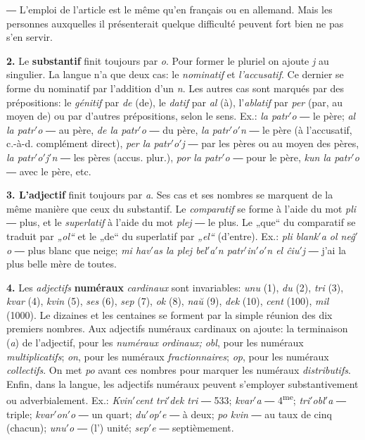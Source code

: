 {\footnotesize {} ― L’emploi de l’article est le même qu’en français ou en allemand. Mais les personnes auxquelles il présenterait quelque difficulté peuvent fort bien ne pas s’en servir.}

\textbf{2.} Le \textbf{substantif} finit toujours par \emph{o}. Pour former le pluriel on ajoute \emph{j} au singulier. La langue n’a que deux cas: le \emph{nominatif} et \emph{l’accusatif}. Ce dernier se forme du nominatif par l’addition d’un \emph{n}. Les autres cas sont marqués par des prépositions: le \emph{génitif} par \emph{de} (de), le \emph{datif} par \emph{al} (à), l’\emph{ablatif} par \emph{per} (par, au moyen de) ou par d’autres prépositions, selon le sens. Ex.: \emph{la patr$'$o} ― le père; \emph{al la patr$'$o} ― au père, \emph{de la patr$'$o} ― du père, \emph{la patr$'$o$'$n} ― le père (à l’accusatif, c.-à-d. complément direct), \emph{per la patr$'$o$'$j} ― par les pères ou au moyen des pères, \emph{la patr$'$o$'$j$'$n} ― les pères (accus. plur.), \emph{por la patr$'$o} ― pour le père, \emph{kun la patr$'$o} ― avec le père, etc.

\textbf{3. L’adjectif} finit toujours par \emph{a}. Ses cas et ses nombres se marquent de la même manière que ceux du substantif. Le \emph{comparatif} se forme à l’aide du mot \emph{pli} ― plus, et le \emph{superlatif} à l’aide du mot \emph{plej} ― le plus. Le „que“ du comparatif se traduit par \emph{„ol“} et le „de“ du superlatif par \emph{„el“} (d’entre). Ex.: \emph{pli blank$'$a ol neĝ$'$o} ― plus blanc que neige; \emph{mi hav$'$as la plej bel$'$a$'$n patr$'$in$'$o$'$n el ĉiu$'$j} ― j’ai la plus belle mère de toutes.

\textbf{4.} Les \emph{adjectifs} \textbf{numéraux} \emph{cardinaux} sont invariables: \emph{unu} (1), \emph{du} (2), \emph{tri} (3), \emph{kvar} (4), \emph{kvin} (5), \emph{ses} (6), \emph{sep} (7), \emph{ok} (8), \emph{naŭ} (9), \emph{dek} (10), \emph{cent} (100), \emph{mil} (1000). Le dizaines et les centaines se forment par la simple réunion des dix premiers nombres. Aux adjectifs numéraux cardinaux on ajoute: la terminaison (\emph{a}) de l’adjectif, pour les \emph{numéraux ordinaux;} \emph{obl}, pour les numéraux \emph{multiplicatifs}; \emph{on}, pour les numéraux \emph{fractionnaires}; \emph{op}, pour les numéraux \emph{collectifs}. On met \emph{po} avant ces nombres pour marquer les numéraux \emph{distributifs}. Enfin, dans la langue, les adjectifs numéraux peuvent s’employer substantivement ou adverbialement. Ex.: \emph{Kvin$'$cent tri$'$dek tri} ― 533; \emph{kvar$'$a} ― 4\textsuperscript{me}; \emph{tri$'$obl$'$a} ― triple; \emph{kvar$'$on$'$o} ― un quart; \emph{du$'$op$'$e} ― à deux; \emph{po kvin} ― au taux de cinq (chacun); \emph{unu$'$o} ― (l’) unité; \emph{sep$'$e} ― septièmement.

